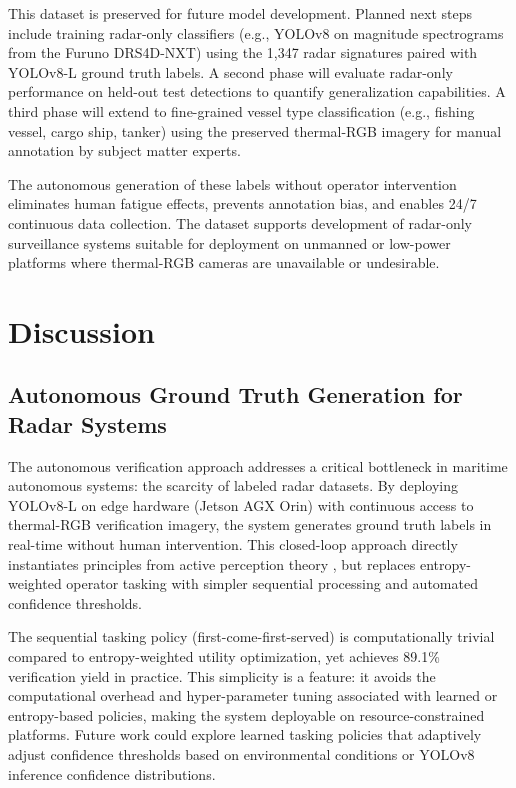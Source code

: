 \documentclass[conf]{asmeconf}
\begin{document}
This dataset is preserved for future model development. Planned next steps include training radar-only classifiers (e.g., YOLOv8 on magnitude spectrograms from the Furuno DRS4D-NXT) using the 1,347 radar signatures paired with YOLOv8-L ground truth labels. A second phase will evaluate radar-only performance on held-out test detections to quantify generalization capabilities. A third phase will extend to fine-grained vessel type classification (e.g., fishing vessel, cargo ship, tanker) using the preserved thermal-RGB imagery for manual annotation by subject matter experts.

The autonomous generation of these labels without operator intervention eliminates human fatigue effects, prevents annotation bias, and enables 24/7 continuous data collection. The dataset supports development of radar-only surveillance systems suitable for deployment on unmanned or low-power platforms where thermal-RGB cameras are unavailable or undesirable.

\section{Discussion}

\subsection{Autonomous Ground Truth Generation for Radar Systems}

The autonomous verification approach addresses a critical bottleneck in maritime autonomous systems: the scarcity of labeled radar datasets. By deploying YOLOv8-L on edge hardware (Jetson AGX Orin) with continuous access to thermal-RGB verification imagery, the system generates ground truth labels in real-time without human intervention. This closed-loop approach directly instantiates principles from active perception theory \cite{Bajcsy1988ActivePerception, BajcsyAloimonosTsotsos2016Revisiting}, but replaces entropy-weighted operator tasking with simpler sequential processing and automated confidence thresholds.

The sequential tasking policy (first-come-first-served) is computationally trivial compared to entropy-weighted utility optimization, yet achieves 89.1\% verification yield in practice. This simplicity is a feature: it avoids the computational overhead and hyper-parameter tuning associated with learned or entropy-based policies, making the system deployable on resource-constrained platforms. Future work could explore learned tasking policies that adaptively adjust confidence thresholds based on environmental conditions or YOLOv8 inference confidence distributions.
\end{document}
